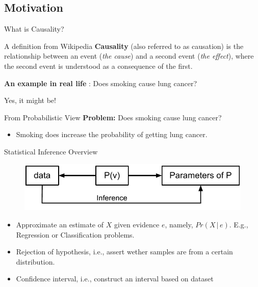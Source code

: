 \documentclass{beamer}
\begin{document}
\subsection{Motivation}
\begin{frame}{What is Causality?}
\begin{block}{A definition from Wikipedia}
\textbf{Causality} (also referred to as causation) is the relationship
between an event (\textit{the cause}) and a second event (\textit{the effect}),
where the second event is understood as a consequence of the
first.
\end{block}\pause
\textbf{An example in real life} : Does smoking cause lung cancer?\\
\pause	
\begin{center}
\alert{Yes, it might be!}
\end{center}
\end{frame}
\begin{frame}{From Probabilistic View }
\textbf{Problem:} Does smoking cause lung cancer?\pause
\begin{center}
\begin{itemize}
\item Smoking does \alert{increase the probability} of getting lung cancer.
\end{itemize}
\end{center}
\end{frame}
\begin{frame}{Statistical Inference Overview}
\begin{figure}
\includegraphics[scale=0.7]{imgs/statInf}
\end{figure}
\begin{itemize}
\item Approximate an estimate of $X$ given evidence $e$, namely, $Pr(X\,|\,e)$. E.g., Regression or Classification problems.
\item Rejection of hypothesis, i.e., assert wether samples are from a certain distribution.  
\item Confidence interval, i.e., construct an interval based on dataset 
\end{itemize}
\end{frame}
\end{document}
